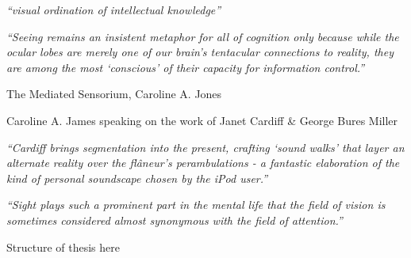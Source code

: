 \textit{``visual ordination of intellectual knowledge''}

\textit{``Seeing remains an insistent metaphor for all of cognition only because while the ocular lobes are merely one of our brain's tentacular connections to reality, they are among the most `conscious' of their capacity for information control.''}

The Mediated Sensorium, Caroline A. Jones



Caroline A. James speaking on the work of Janet Cardiff \& George Bures Miller

\textit{``Cardiff brings segmentation into the present, crafting `sound walks' that layer an alternate reality over the fl\^aneur's perambulations - a fantastic elaboration of the kind of personal soundscape chosen by the iPod user.''}


\textit{``Sight plays such a prominent part in the mental life that the field of vision is sometimes considered almost synonymous with the field of attention.''}~\cite{Lucas1951}


Structure of thesis here
